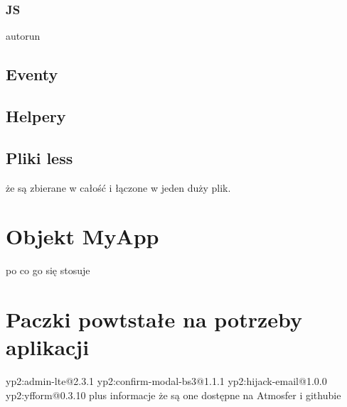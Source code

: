     \subsubsection{JS}
    autorun
  \subsection{Eventy}
  \subsection{Helpery}
  \subsection{Pliki less}
    że są zbierane w całość i łączone w jeden duży plik.
  
\section{Objekt MyApp}
  po co go się stosuje

  
\section{Paczki powtstałe na potrzeby aplikacji}
yp2:admin-lte@2.3.1
yp2:confirm-modal-bs3@1.1.1
yp2:hijack-email@1.0.0
yp2:yfform@0.3.10
plus informacje że są one dostępne na Atmosfer i githubie
